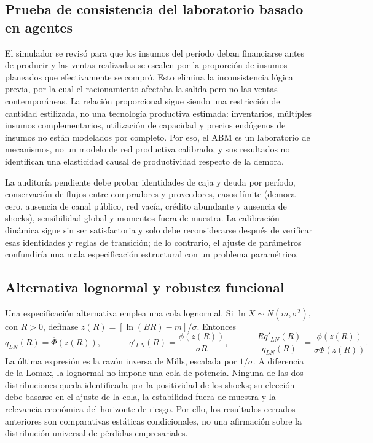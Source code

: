 \documentclass[11pt,a4paper]{article}
\begin{document}
\subsection{Prueba de consistencia del laboratorio basado en agentes}
El simulador se revisó para que los insumos del período deban financiarse antes de producir y las ventas realizadas se escalen por la proporción de insumos planeados que efectivamente se compró. Esto elimina la inconsistencia lógica previa, por la cual el racionamiento afectaba la salida pero no las ventas contemporáneas. La relación proporcional sigue siendo una restricción de cantidad estilizada, no una tecnología productiva estimada: inventarios, múltiples insumos complementarios, utilización de capacidad y precios endógenos de insumos no están modelados por completo. Por eso, el ABM es un laboratorio de mecanismos, no un modelo de red productiva calibrado, y sus resultados no identifican una elasticidad causal de productividad respecto de la demora.

La auditoría pendiente debe probar identidades de caja y deuda por período, conservación de flujos entre compradores y proveedores, casos límite (demora cero, ausencia de canal público, red vacía, crédito abundante y ausencia de shocks), sensibilidad global y momentos fuera de muestra. La calibración dinámica sigue sin ser satisfactoria y solo debe reconsiderarse después de verificar esas identidades y reglas de transición; de lo contrario, el ajuste de parámetros confundiría una mala especificación estructural con un problema paramétrico.

\subsection{Alternativa lognormal y robustez funcional}
Una especificación alternativa emplea una cola lognormal. Si $\ln X\sim N(m,\sigma^2)$, con $R>0$, defínase $z(R)=[\ln(BR)-m]/\sigma$. Entonces
\begin{equation}
q_{LN}(R)=\overline\Phi(z(R)),\qquad -q'_{LN}(R)=\frac{\phi(z(R))}{\sigma R},\qquad -\frac{Rq'_{LN}(R)}{q_{LN}(R)}=\frac{\phi(z(R))}{\sigma\overline\Phi(z(R))}. \label{eq:lognormal}
\end{equation}
La última expresión es la razón inversa de Mills, escalada por $1/\sigma$. A diferencia de la Lomax, la lognormal no impone una cola de potencia. Ninguna de las dos distribuciones queda identificada por la positividad de los shocks; su elección debe basarse en el ajuste de la cola, la estabilidad fuera de muestra y la relevancia económica del horizonte de riesgo. Por ello, los resultados cerrados anteriores son comparativas estáticas condicionales, no una afirmación sobre la distribución universal de pérdidas empresariales.
\end{document}
